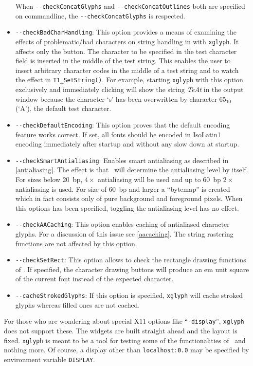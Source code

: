 \begin{itemize}
  When \verb+--checkConcatGlyphs+ and \verb+--checkConcatOutlines+ both are
  specified on commandline, the \verb+--checkConcatGlyphs+ is respected.
\item\verb+--checkBadCharHandling+: This option provides a means of
  examining the effects of problematic/bad characters on string handling in
  \tonelib with \verb+xglyph+. It affects only the  button.
  The character to be specified in the test character field is inserted in
  the middle of the test string. This enables the user to insert arbitrary
  character codes in the middle of a test string and to watch the effect in
  \verb+T1_SetString()+. For example, starting \verb+xglyph+ with this
  option exclusively and immediately clicking  will show
  the string {\em TeAt} in the output window because the character `s' has
  been overwritten by character $65_{10}$ (`A'), the default test character.
\item\verb+--checkDefaultEncoding+: This option proves that the default
  encoding feature works correct. If set, all fonts should be encoded in
  IsoLatin1 encoding immediately after startup and without any slow down at
  startup. 
\item\verb+--checkSmartAntialiasing+: Enables smart antialiasing as described
  in \ref{antialiasing}. The effect is that \tonelib\ will determine the
  antialiasing level by itself.  For sizes below 20~bp, $4\times$ antialiasing
  will be used and up to 60~bp $2\times$ antialiasing is used. For size of
  60~bp and larger a ``bytemap'' is created which in fact consists only of
  pure background and foreground pixels. When this options has been
  specified, toggling the antialiasing level has no effect.
\item\verb+--checkAACaching+: This option enables caching of antialiased
  character glyphs. For a discussion of this issue see \ref{aacaching}. The
  string rastering functions are not affected by this option.
\item \verb+--checkSetRect+: This option allows to check the rectangle drawing
  functions of \tonelib. If specified, the character drawing buttons will
  produce an em unit square of the current font instead of the expected
  character.  
\item \verb+--cacheStrokedGlyphs+: If this option is specified, \verb+xglyph+
  will cache stroked glyphs whereas filled ones are not cached.
\end{itemize}
For those who are wondering about special X11 options like ``\verb+-display+'',
\verb+xglyph+ does not support these. The widgets are built straight ahead and
the layout is fixed. \verb+xglyph+ is meant to be a tool for testing some of
the functionalities of \tonelib\ and nothing more. Of course, a display other
than \verb+localhost:0.0+ may be specified by environment variable
\verb+DISPLAY+. 


